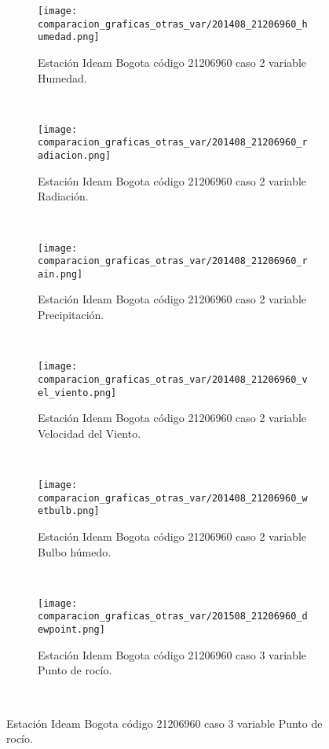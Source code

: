 \begin{figure}[H]
\centering
\begin{subfigure}[normla]{0.4\textwidth}
\caption{Estación Ideam Bogota código 21206960 caso 2 variable Humedad.}
\texttt{[image: comparacion\_graficas\_otras\_var/201408\_21206960\_humedad.png]}
\end{subfigure}
~
\begin{subfigure}[normla]{0.4\textwidth}
\caption{Estación Ideam Bogota código 21206960 caso 2 variable Radiación.}
\texttt{[image: comparacion\_graficas\_otras\_var/201408\_21206960\_radiacion.png]}
\end{subfigure}
~
\begin{subfigure}[normla]{0.4\textwidth}
\caption{Estación Ideam Bogota código 21206960 caso 2 variable Precipitación.}
\texttt{[image: comparacion\_graficas\_otras\_var/201408\_21206960\_rain.png]}
\end{subfigure}
~
\begin{subfigure}[normla]{0.4\textwidth}
\caption{Estación Ideam Bogota código 21206960 caso 2 variable Velocidad del Viento.}
\texttt{[image: comparacion\_graficas\_otras\_var/201408\_21206960\_vel\_viento.png]}
\end{subfigure}
~
\begin{subfigure}[normla]{0.4\textwidth}
\caption{Estación Ideam Bogota código 21206960 caso 2 variable Bulbo húmedo.}
\texttt{[image: comparacion\_graficas\_otras\_var/201408\_21206960\_wetbulb.png]}
\end{subfigure}
~
\begin{subfigure}[normla]{0.4\textwidth}
\caption{Estación Ideam Bogota código 21206960 caso 3 variable Punto de rocío.}
\texttt{[image: comparacion\_graficas\_otras\_var/201508\_21206960\_dewpoint.png]}
\end{subfigure}
~
\end{figure}
           
